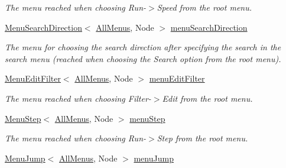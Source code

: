 \begin{DoxyCompactItemize}
\begin{DoxyCompactList}\small\item\em The menu reached when choosing Run-\/$>$Speed from the root menu. \end{DoxyCompactList}\item 
\hyperlink{structslb_1_1core_1_1ui_1_1MenuSearchDirection}{Menu\+Search\+Direction}$<$ \hyperlink{structslb_1_1core_1_1ui_1_1AllMenus}{All\+Menus}, Node $>$ \hyperlink{structslb_1_1core_1_1ui_1_1AllMenus_ac19791733540dbbbfa18b5c7a38a3e52}{menu\+Search\+Direction}\hypertarget{structslb_1_1core_1_1ui_1_1AllMenus_ac19791733540dbbbfa18b5c7a38a3e52}{}\label{structslb_1_1core_1_1ui_1_1AllMenus_ac19791733540dbbbfa18b5c7a38a3e52}

\begin{DoxyCompactList}\small\item\em The menu for choosing the search direction after specifying the search in the search menu (reached when choosing the Search option from the root menu). \end{DoxyCompactList}\item 
\hyperlink{structslb_1_1core_1_1ui_1_1MenuEditFilter}{Menu\+Edit\+Filter}$<$ \hyperlink{structslb_1_1core_1_1ui_1_1AllMenus}{All\+Menus}, Node $>$ \hyperlink{structslb_1_1core_1_1ui_1_1AllMenus_a64ce1352de888b4a963e1f1e52ddd770}{menu\+Edit\+Filter}\hypertarget{structslb_1_1core_1_1ui_1_1AllMenus_a64ce1352de888b4a963e1f1e52ddd770}{}\label{structslb_1_1core_1_1ui_1_1AllMenus_a64ce1352de888b4a963e1f1e52ddd770}

\begin{DoxyCompactList}\small\item\em The menu reached when choosing Filter-\/$>$Edit from the root menu. \end{DoxyCompactList}\item 
\hyperlink{structslb_1_1core_1_1ui_1_1MenuStep}{Menu\+Step}$<$ \hyperlink{structslb_1_1core_1_1ui_1_1AllMenus}{All\+Menus}, Node $>$ \hyperlink{structslb_1_1core_1_1ui_1_1AllMenus_a95a0884ed69014c8d7d4d79c70cd46b6}{menu\+Step}\hypertarget{structslb_1_1core_1_1ui_1_1AllMenus_a95a0884ed69014c8d7d4d79c70cd46b6}{}\label{structslb_1_1core_1_1ui_1_1AllMenus_a95a0884ed69014c8d7d4d79c70cd46b6}

\begin{DoxyCompactList}\small\item\em The menu reached when choosing Run-\/$>$Step from the root menu. \end{DoxyCompactList}\item 
\hyperlink{structslb_1_1core_1_1ui_1_1MenuJump}{Menu\+Jump}$<$ \hyperlink{structslb_1_1core_1_1ui_1_1AllMenus}{All\+Menus}, Node $>$ \hyperlink{structslb_1_1core_1_1ui_1_1AllMenus_a04f2d7f044dfc2267715f63eab5506f8}{menu\+Jump}\hypertarget{structslb_1_1core_1_1ui_1_1AllMenus_a04f2d7f044dfc2267715f63eab5506f8}{}\label{structslb_1_1core_1_1ui_1_1AllMenus_a04f2d7f044dfc2267715f63eab5506f8}


\end{DoxyCompactItemize}

